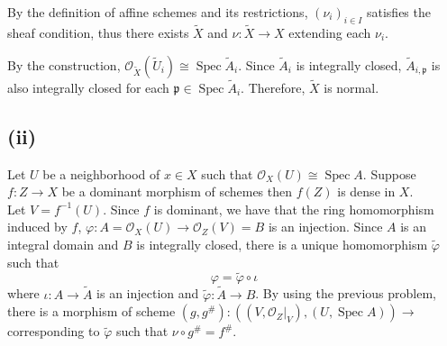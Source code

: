 \documentclass{article}
\numberwithin{equation}{section}
\DeclareMathOperator{\Spec}{Spec}
\begin{document}
By the definition of affine schemes and its restrictions, $(\nu_i)_{i\in I}$ satisfies the sheaf condition, thus there exists $\tilde{X}$ and $\nu:\tilde{X}\to X$ extending each $\nu_i$. \\
\par By the construction, $\mathcal{O}_{\tilde{X}}(\tilde{U}_i)\cong\Spec \tilde{A}_i$. Since $\tilde{A}_i$ is integrally closed, $\tilde{A}_{i,\mathfrak{p}}$ is also integrally closed for each $\mathfrak{p}\in\Spec \tilde{A}_i$. Therefore, $\tilde{X}$ is normal.

\subsection*{(ii)}

Let $U$ be a neighborhood of $x\in X$ such that $\mathcal{O}_X(U)\cong\Spec A$. Suppose $f:Z\to X$ be a dominant morphism of schemes then $f(Z)$ is dense in $X$.\\
Let $V=f^{-1}(U)$. Since $f$ is dominant, we have that the ring homomorphism induced by $f$, $\varphi: A=\mathcal{O}_X(U)\to \mathcal{O}_Z(V)=B$ is an injection. Since $A$ is an integral domain and $B$ is integrally closed, there is a unique homomorphism $\tilde{\varphi}$ such that
\begin{equation*}
\varphi = \tilde{\varphi}\circ\iota
\end{equation*}
where $\iota:A\to\tilde{A}$ is an injection and $\tilde{\varphi}:\tilde{A}\to B$. By using the previous problem, there is a morphism of scheme $(g,g^{\#}):((V,\mathcal{O}_Z|_V),(U,\Spec A))\to$ corresponding to $\tilde{\varphi}$ such that $\nu\circ g^{\#} = f^{\#}$.
\end{document}
